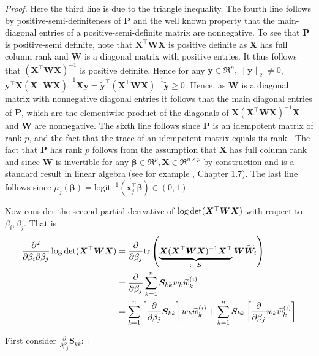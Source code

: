 \documentclass[11pt, a4paper]{article}
\newcommand*{\bb}{\boldsymbol}
\theoremstyle{example} \newtheorem{example}{Example}[section]
\theoremstyle{theorem} \newtheorem{theorem}{Theorem}[section]
\theoremstyle{theorem }\newtheorem{proposition}{Proposition}[section]
\theoremstyle{theorem }\newtheorem{corollary}{Corollary}[section]
\def\det{{\mathop{\rm det}}}
\def\\bbeta{\bb{\\bbeta}}
\begin{document}
\begin{proof}
Here the third line is due to the triangle inequality. The fourth line follows by positive-semi-definiteness of $\bb P$ and the well known property that the main-diagonal entries of a positive-semi-definite matrix are nonnegative. To see that $\bb P$ is positive-semi definite, note that $\bb X^\top\bb W\bb X$ is positive definite as $\bb X$ has full column rank and $\bb W$ is a diagonal matrix with positive entries. It thus follows that $(\bb X^\top\bb W\bb X)^{-1}$ is positive definite. Hence for any $\bb y \in \Re^{n}, \|\bb y\|_2\neq 0$, $\bb y^\top\bb X(\bb X^\top\bb W\bb X)^{-1}\bb X \bb y = \tilde{\bb y}^\top(\bb X^\top\bb W\bb X)^{-1} \tilde{\bb y} \geq 0$. Hence, as $\bb W$ is a diagonal matrix with nonnegative diagonal entries it follows that the main diagonal entries of $\bb P$, which are the elementwise product of the diagonals of $\bb X(\bb X^\top\bb W\bb X)^{-1}\bb X$ and $\bb W$ are nonnegative. The sixth line follows since $\bb P$ is an idempotent matrix of rank $p$, and the fact that the trace of an idempotent matrix equals its rank \citep[Corollary 10.2.2]{harville:1998}. The fact that $\bb P$ has rank $p$ follows from the assumption that $\bb X$ has full column rank and since $\bb W$ is invertible for any $\bb\beta \in \Re^p,\bb X\in \Re^{n \times p}$ by construction and is a standard result in linear algebra (see for example \cite{magnus+neudecker:2019}, Chapter 1.7).  The last line follows since $\mu_j(\bb\beta) = \textrm{logit}^{-1}(\bb x_j^{\top}\bb \beta) \in (0,1)$. 

Now consider the second partial derivative of $\log \det(\bb X^\top\bb W\bb X)$ with respect to $\beta_i,\beta_j$. That is 
\begin{equation}
\begin{aligned}
\frac{\partial^2}{\partial \beta_i \partial \beta_j} \log\det (\bb X^\top\bb W \bb X) &= \frac{\partial}{\partial \beta_j} \textrm{tr}\left( \underbrace{\bb X(\bb X^\top\bb W\bb X)^{-1}\bb X^\top}_{:=\bb S}\bb W\widetilde{\bb W}_i\right) \\ 
&= \frac{\partial}{\partial \beta_j} \sum_{k=1}^{n}\bb S_{kk}w_k \widetilde{w}^{(i)}_k \\ 
&= \sum_{k=1}^{n}\left[\frac{\partial}{\partial \beta_j}\bb S_{kk}\right]w_k \widetilde{w}^{(i)}_k + \sum_{k=1}^{n}\bb S_{kk}\left[\frac{\partial}{\partial \beta_j}w_k \widetilde{w}^{(i)}_k\right]
\end{aligned}
\end{equation}

First consider $\frac{\partial}{\partial \beta_j}\bb S_{kk}$: 


\end{proof}
\end{document}
